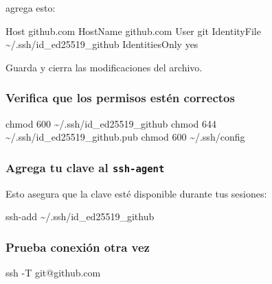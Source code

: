 \documentclass[
  spanish,
  12pt,
  letterpaper,
  DIV=11,
  numbers=noendperiod]{scrreprt}
\newenvironment{Shaded}{\begin{snugshade}}{\end{snugshade}}
\newcommand{\AttributeTok}[1]{\textcolor[rgb]{0.40,0.45,0.13}{#1}}
\newcommand{\ExtensionTok}[1]{\textcolor[rgb]{0.00,0.23,0.31}{#1}}
\newcommand{\FunctionTok}[1]{\textcolor[rgb]{0.28,0.35,0.67}{#1}}
\newcommand{\NormalTok}[1]{\textcolor[rgb]{0.00,0.23,0.31}{#1}}
\begin{document}
agrega esto:

\begin{Shaded}
\begin{Highlighting}[]
\ExtensionTok{Host}\NormalTok{ github.com}
  \ExtensionTok{HostName}\NormalTok{ github.com}
  \ExtensionTok{User}\NormalTok{ git}
  \ExtensionTok{IdentityFile}\NormalTok{ \textasciitilde{}/.ssh/id\_ed25519\_github}
  \ExtensionTok{IdentitiesOnly}\NormalTok{ yes}
\end{Highlighting}
\end{Shaded}

Guarda y cierra las modificaciones del archivo.

\subsubsection{Verifica que los permisos estén
correctos}\label{verifica-que-los-permisos-estuxe9n-correctos-1}

\begin{Shaded}
\begin{Highlighting}[]
\FunctionTok{chmod}\NormalTok{ 600 \textasciitilde{}/.ssh/id\_ed25519\_github}
\FunctionTok{chmod}\NormalTok{ 644 \textasciitilde{}/.ssh/id\_ed25519\_github.pub}
\FunctionTok{chmod}\NormalTok{ 600 \textasciitilde{}/.ssh/config}
\end{Highlighting}
\end{Shaded}

\subsubsection{\texorpdfstring{\textbf{Agrega tu clave al
\texttt{ssh-agent}}}{Agrega tu clave al ssh-agent}}\label{agrega-tu-clave-al-ssh-agent-1}

Esto asegura que la clave esté disponible durante tus sesiones:

\begin{Shaded}
\begin{Highlighting}[]
\FunctionTok{ssh{-}add}\NormalTok{ \textasciitilde{}/.ssh/id\_ed25519\_github}
\end{Highlighting}
\end{Shaded}

\subsubsection{Prueba conexión otra
vez}\label{prueba-conexiuxf3n-otra-vez-1}

\begin{Shaded}
\begin{Highlighting}[]
\FunctionTok{ssh} \AttributeTok{{-}T}\NormalTok{ git@github.com}
\end{Highlighting}
\end{Shaded}
\end{document}
